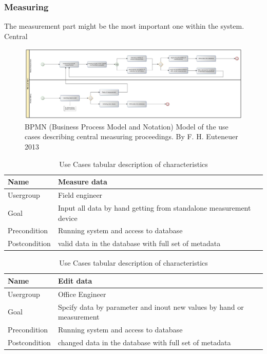 \subsubsection{Measuring}

The measurement part might be the most important one within the system. Central 

\begin{figure}[H]
	\centering
 	 \includegraphics[scale=0.24]{graphics/bpmn_use-cases_measurement.jpg} 
	\caption{BPMN (Business Process Model and Notation) Model of the use cases describing central measuring proceedings. By F. H. Euteneuer 2013}
	 \label{fig:bpmn_use-case_measuring}
\end{figure}

\begin{table}[H]
\centering
\begin{tabular}{l | p{11cm}}
Name & Measure data\\ \hline 
Usergroup & Field engineer\\ \hline 
Goal & Input all data by hand  getting from standalone measurement device\\ \hline 
Precondition & Running system and access to database\\ \hline 
Postcondition & valid data in the database with full set of metadata\\ 
\end{tabular}
\caption{Use Cases tabular description of characteristics} 
\label{table:use case description of "Measure data"}
\end{table}

\begin{table}[H]
\centering
\begin{tabular}{l | p{11cm}}
Name & Edit data\\ \hline 
Usergroup & Office Engineer\\ \hline 
Goal & Spcify data by parameter and inout new values by hand or measurement\\ \hline 
Precondition & Running system and access to database\\ \hline 
Postcondition & changed data in the database with full set of metadata\\ 
\end{tabular}
\caption{Use Cases tabular description of characteristics} 
\label{table:use case description of "Edit data"}
\end{table}


